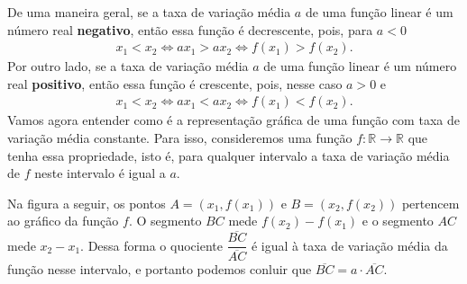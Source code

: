 De uma maneira geral, se a taxa de variação média \(a\) de uma função linear é um número real \textbf{negativo}, então essa função é decrescente, pois, para \(a<0\)
\begin{equation*}
\begin{split}x_1<x_2 \Longleftrightarrow ax_1>ax_2 \Longleftrightarrow f(x_1)>f(x_2).\end{split}
\end{equation*}
Por outro lado, se a taxa de variação média \(a\) de uma função linear é um número real \textbf{positivo}, então essa função é crescente, pois, nesse caso \(a>0\) e
\begin{equation*}
\begin{split}x_1<x_2 \Longleftrightarrow ax_1<ax_2 \Longleftrightarrow f(x_1)<f(x_2).\end{split}
\end{equation*}
Vamos agora entender como é a representação gráfica de uma função com taxa de variação média constante. Para isso, consideremos uma função \(f:\mathbb{R}\to\mathbb{R}\) que tenha essa propriedade, isto é, para qualquer intervalo a taxa de variação média de \(f\) neste intervalo é igual a \(a\).

Na figura a seguir, os pontos \(A=(x_1,f(x_1))\) e \(B=(x_2,f(x_2))\) pertencem ao gráfico da função \(f\). O segmento \(BC\) mede \(f(x_2)-f(x_1)\) e o segmento \(AC\) mede \(x_2-x_1\). Dessa forma o quociente \(\dfrac{\overline{BC}}{\overline{AC}}\) é igual à taxa de variação média da função nesse intervalo, e portanto podemos conluir que \(\overline{BC}=a\cdot \overline{AC}\).

\begin{figure}[H]
\centering


\end{figure}

